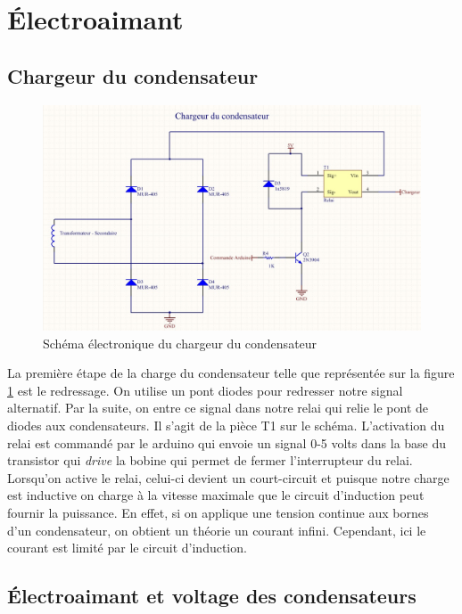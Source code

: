 
\section{Électroaimant}

\subsection{Chargeur du condensateur}

  \begin{figure}[ht]
    \centering
    \includegraphics[scale=0.4]{resources/chargeur.jpg}
    \caption{Schéma électronique du chargeur du condensateur}
    \label{fig:chargeur}
  \end{figure}

La première étape de la charge du condensateur telle que représentée sur la figure \ref{fig:chargeur} est le redressage.
On utilise un pont diodes pour redresser notre signal alternatif.
Par la suite, on entre ce signal dans notre relai qui relie le pont de diodes aux condensateurs.
Il s'agit de la pièce T1 sur le schéma.
L'activation du relai est commandé par le arduino qui envoie un signal 0-5 volts dans la base du transistor qui \textit{drive} la bobine qui permet de
fermer l'interrupteur du relai.
Lorsqu'on active le relai, celui-ci devient un court-circuit et puisque notre charge est inductive on charge à la vitesse maximale
que le circuit d'induction peut fournir la puissance. En effet, si on applique une tension continue aux bornes d'un condensateur,
on obtient un théorie un courant infini. Cependant, ici le courant est limité par le circuit d'induction.

\subsection{Électroaimant et voltage des condensateurs}

